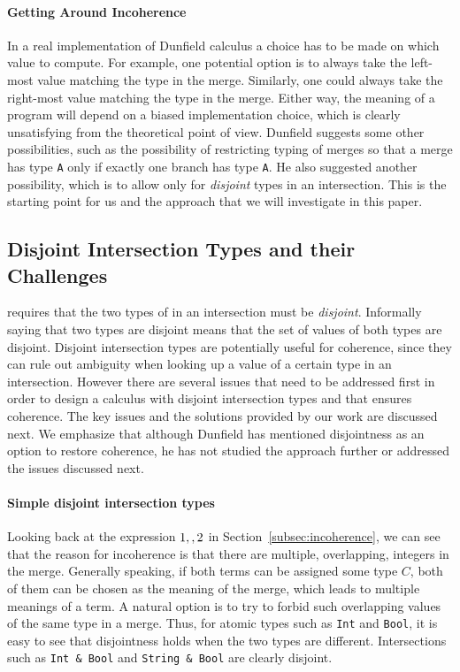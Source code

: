 \paragraph{Getting Around Incoherence}
In a real implementation of Dunfield calculus a choice has to be made
on which value to compute. For example, one potential option is to
always take the left-most value matching the type in the
merge. Similarly, one could always take the right-most value matching
the type in the merge. Either way, the meaning of a program will
depend on a biased implementation choice, which is clearly
unsatisfying from the theoretical point of view.  Dunfield suggests
some other possibilities, such as the possibility of restricting typing
of merges so that a merge has type \lstinline$A$ only if exactly one
branch has type \lstinline$A$. He also suggested another possibility,
which is to allow only for \emph{disjoint} types in an intersection.
This is the starting point for us and the approach that we will 
investigate in this paper. 

\subsection{Disjoint Intersection Types and their Challenges}
\name requires that the
two types of in an intersection must be \emph{disjoint}.
Informally saying that two types are disjoint means that the set of
values of both types are disjoint. Disjoint intersection types are
potentially useful for coherence, since they can rule out ambiguity
when looking up a value of a certain type in an intersection. However
there are several issues that need to be addressed first in order to
design a calculus with disjoint intersection types and that ensures
coherence. The key issues and the solutions provided by our work are
discussed next. We emphasize that although Dunfield
has mentioned disjointness as an option to restore coherence, he
has not studied the approach further or addressed the issues discussed next.

\paragraph{Simple disjoint intersection types}
Looking back at the expression $1 ,, 2$ in
Section~\ref{subsec:incoherence}, we can see that the reason for
incoherence is that there are multiple, overlapping, integers in the
merge. Generally speaking, if both terms can be assigned some type
$C$, both of them can be chosen as the meaning of the merge, which
leads to multiple meanings of a term. A natural option is to try
to forbid such overlapping values of the same type in a merge.
Thus, for atomic types such as \lstinline$Int$ and \lstinline$Bool$, it is
easy to see that disjointness holds when the two types are
different. Intersections such as \lstinline$Int & Bool$ and 
\lstinline$String & Bool$ are clearly disjoint.

